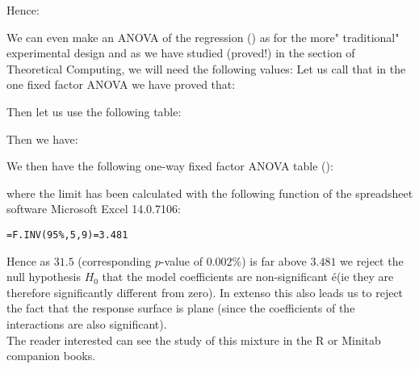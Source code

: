 	\begin{tcolorbox}[colframe=black,colback=white,sharp corners]
	Hence:
	
	We can even make an ANOVA of the regression () as for the more" traditional" experimental design and as we have studied (proved!) in the section of Theoretical Computing, we will need the following values:
	Let us call that in the one fixed factor ANOVA we have proved that:
	
	Then let us use the following table:
	
	Then we have:
	
	\end{tcolorbox}
	
	\begin{tcolorbox}[colframe=black,colback=white,sharp corners]
	We then have the following one-way fixed factor ANOVA table ():
	
	where the limit has been calculated with the following function of the spreadsheet software Microsoft Excel 14.0.7106:
	\begin{center}
		\texttt{=F.INV(95\%,5,9)=3.481}
	\end{center}
	Hence as $31.5$ (corresponding $p$-value of $0.002\%$) is far above $3.481$ we reject the null hypothesis $H_0$ that the model coefficients are non-significant é(ie they are therefore significantly different from zero). In extenso this also leads us to reject the fact that the response surface is plane (since the coefficients of the interactions are also significant).\\
	
	The reader interested can see the study of this mixture in the R or Minitab companion books.
	\end{tcolorbox}
	
	\pagebreak
